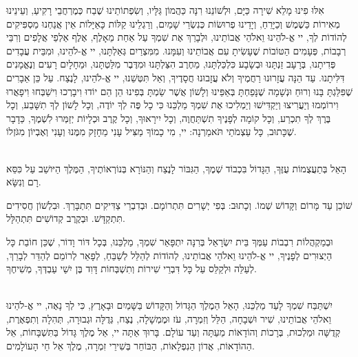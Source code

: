 אִלּוּ פִינוּ מָלֵא שִׁירָה כַּיָּם, וּלְשׁוֹנֵנוּ רִנָּה כַּהֲמוֹן גַּלָּיו, וְשִׂפְתוֹתֵינוּ שֶׁבַח כְּמֶרְחֲבֵי רָקִיעַ, וְעֵינֵינוּ מְאִירוֹת כַּשֶׁמֶשׁ וְכַיָּרֵחַ, וְיָדֵינוּ פְרוּשׂוֹת כְּנִשְׂרֵי שָׁמַיִם, וְרַגְלֵינוּ קַלּוֹת כָּאַיָּלוֹת אֵין אֲנַחְנוּ מַסְפִּיקִים לְהוֹדוֹת לְךָ, יי אֱ-לֹהֵינוּ וֵאלֹהֵי אֲבוֹתֵינוּ, וּלְבָרֵךְ אֶת שִׁמְךָ עַל אַחַת מֵאָלֶף, אֶלֶף אַלְפֵי אֲלָפִים וְרִבֵּי רְבָבוֹת, פְּעָמִים הַטּוֹבוֹת שֶׁעָשִׂיתָ עִם אֲבוֹתֵינוּ וְעִמָּנוּ. מִמִּצְרַיִם גְּאַלְתָּנוּ, יי אֱ-לֹהֵינוּ, וּמִבֵּית עֲבָדִים פְּדִיתָנוּ, בְּרָעָב זַנְתָּנוּ וּבְשָׂבָע כִּלְכַּלְתָּנוּ, מֵחֶרֶב הִצַּלְתָּנוּ וּמִדֶּבֶר מִלַּטְתָּנוּ, וּמֵחָלָיִם רָעִים וְנֶאֱמָנִים דִּלִּיתָנוּ.
עַד הֵנָּה עֲזָרוּנוּ רַחֲמֶיךָ וְלֹא עֲזָבוּנוּ חֲסָדֶיךָ, וְאַל תִּטְּשֵׁנוּ, יי אֱ-לֹהֵינוּ, לָנֶצַח. עַל כֵּן אֵבָרִים שֶׁפִּלַּגְתָּ בָּנוּ וְרוּחַ וּנְשָׁמָה שֶׁנָּפַחְתָּ בְּאַפֵּינוּ וְלָשׁוֹן אֲשֶׁר שַׂמְתָּ בְּפִינוּ הֵן הֵם יוֹדוּ וִיבָרְכוּ וִישַׁבְּחוּ וִיפָאֲרוּ וִירוֹמְמוּ וְיַעֲרִיצוּ וְיַקְדִּישׁוּ וְיַמְלִיכוּ אֶת שִׁמְךָ מַלְכֵּנוּ כִּי כָל פֶּה לְךָ יוֹדֶה, וְכָל לָשׁוֹן לְךָ תִשָּׁבַע, וְכָל בֶּרֶךְ לְךָ תִכְרַע, וְכָל קוֹמָה לְפָנֶיךָ תִשְׁתַּחֲוֶה, וְכָל יִירָאוּךָ, וְכָל קֶרֶב וּכְלָיוֹת יְזַמְּרוּ לִשְׁמֶךָ, כַּדָבָר שֶׁכָּתוּב, כָּל עַצְמֹתַי תֹּאמַרְנָה: יי, מִי כָמוֹךָ מַצִּיל עָנִי מֵחָזָק מִמֶּנוּ וְעָנִי וְאֶבְיוֹן מִגֹּזְלוֹ.

\ \\

הָאֵל בְּתַעֲצֻמוֹת עֻזֶּךָ, הַגָּדוֹל בִּכְבוֹד שְׁמֶךָ, הַגִּבּוֹר לָנֶצַח וְהַנּוֹרָא בְּנוֹרְאוֹתֶיךָ, הַמֶּלֶךְ הַיּושֵׁב עַל כִּסֵּא רָם וְנִשָּׂא.

שׁוֹכֵן עַד מָּרוֹם וְקָּדוֹשׁ שְׁמוֹ. וְכָתוּב: 
בְּפִי יְשָׁרִים תִּתְרוֹמָם. וּבְדִבְרֵי צַדִּיקִים תִּתְבָּרַךְ. וּבִלְשׁוֹן חֲסִידִים תִּתְקַדָּשׁ. וּבְקֶרֶב קְדוֹשִׁים תִּתְהַלָּל. 

וּבְמַקְהֲלוֹת רִבְבוֹת עַמְּךָ בֵּית יִשְׂרָאֵל בְּרִנָּה יִתְפָּאֵר שִׁמְךָ, מַלְכֵּנוּ, בְּכָל דּוֹר וָדוֹר, שֶׁכֵּן חוֹבַת כָּל הַיְצוּרִים לְפָנֶיךָ, יי אֱ-לֹהֵינוּ וֵאלֹהֵי אֲבוֹתֵינוּ, לְהוֹדוֹת לְהַלֵּל לְשַׁבֵּחַ, לְפָאֵר לְרוֹמֵם לְהַדֵּר לְבָרֵךְ, לְעַלֵּה וּלְקַלֵּס עַל כָּל דִּבְרֵי שִׁירוֹת וְתִשְׁבְּחוֹת דָּוִד בֶּן יִשַׁי עַבְדְּךָ, מְשִׁיחֶךָ.

\ \\

יִשְׁתַּבַּח שִׁמְךָ לָעַד מַלְכֵּנוּ, הָאֵל הַמֶלֶךְ הַגָּדוֹל וְהַקָּדוֹשׁ בַּשָּׁמַיִם וּבָאָרֶץ, כִּי לְךָ נָאֶה, יי אֱ-לֹהֵינוּ וֵאלֹהֵי אֲבוֹתֵינוּ, שִׁיר וּשְׁבָחָה, הַלֵּל וְזִמְרָה, עֹז וּמֶמְשָׁלָה, נֶצַח, גְּדֻלָּה וּגְבוּרָה, תְּהִלָה וְתִפְאֶרֶת, קְדֻשָּׁה וּמַלְכוּת, בְּרָכוֹת וְהוֹדָאוֹת מֵעַתָּה וְעַד עוֹלָם. בָּרוּךְ אַתָּה יי, אֵל מֶלֶךְ גָּדוֹל בַּתִּשְׁבָּחוֹת, אֵל הַהוֹדָאוֹת, אֲדוֹן הַנִפְלָאוֹת, הַבּוֹחֵר בְּשִׁירֵי זִמְרָה, מֶלֶךְ אֵל חֵי הָעוֹלָמִים.

